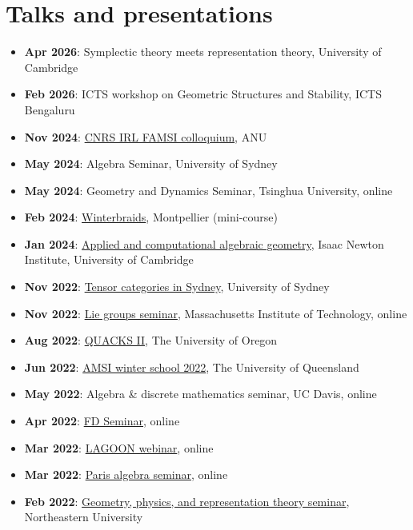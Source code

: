 \documentclass[a4paper]{moderncv}
\begin{document}
\section*{Talks and presentations}
\label{sec:org6f32917}
\begin{itemize}
\item \textbf{Apr 2026}: Symplectic theory meets representation theory, University of Cambridge
\item \textbf{Feb 2026}: ICTS workshop on Geometric Structures and Stability, ICTS Bengaluru
\item \textbf{Nov 2024}: \href{https://maths.anu.edu.au/news-events/events/cnrs-irl-famsi-research-talks}{CNRS IRL FAMSI colloquium}, ANU
\item \textbf{May 2024}: Algebra Seminar, University of Sydney
\item \textbf{May 2024}: Geometry and Dynamics Seminar, Tsinghua University, online
\item \textbf{Feb 2024}: \href{https://winterbraids-xiii.sciencesconf.org/}{Winterbraids}, Montpellier (mini-course)
\item \textbf{Jan 2024}: \href{https://www.newton.ac.uk/event/emgw02/}{Applied and computational algebraic geometry}, Isaac Newton Institute, University of Cambridge
\item \textbf{Nov 2022}: \href{https://www.maths.usyd.edu.au/u/kevinc/TensorCat.html}{Tensor categories in Sydney}, University of Sydney
\item \textbf{Nov 2022}: \href{https://math.mit.edu/lg/}{Lie groups seminar}, Massachusetts Institute of Technology, online
\item \textbf{Aug 2022}: \href{https://pages.uoregon.edu/belias/QUACKSII/index.html}{QUACKS II}, The University of Oregon
\item \textbf{Jun 2022}: \href{https://ws.amsi.org.au/}{AMSI winter school 2022}, The University of Queensland
\item \textbf{May 2022}: Algebra \& discrete mathematics seminar, UC Davis, online
\item \textbf{Apr 2022}: \href{https://www.fd-seminar.xyz/}{FD Seminar}, online
\item \textbf{Mar 2022}: \href{https://sites.google.com/view/lagoonwebinar/home}{LAGOON webinar}, online
\item \textbf{Mar 2022}: \href{https://www.imj-prg.fr/gestion/evenement/affEvenement/1}{Paris algebra seminar}, online
\item \textbf{Feb 2022}: \href{http://mathserver.neu.edu/\~robin/Seminars/GPRT/index.html}{Geometry, physics, and representation theory seminar}, Northeastern University

\end{itemize}
\end{document}
